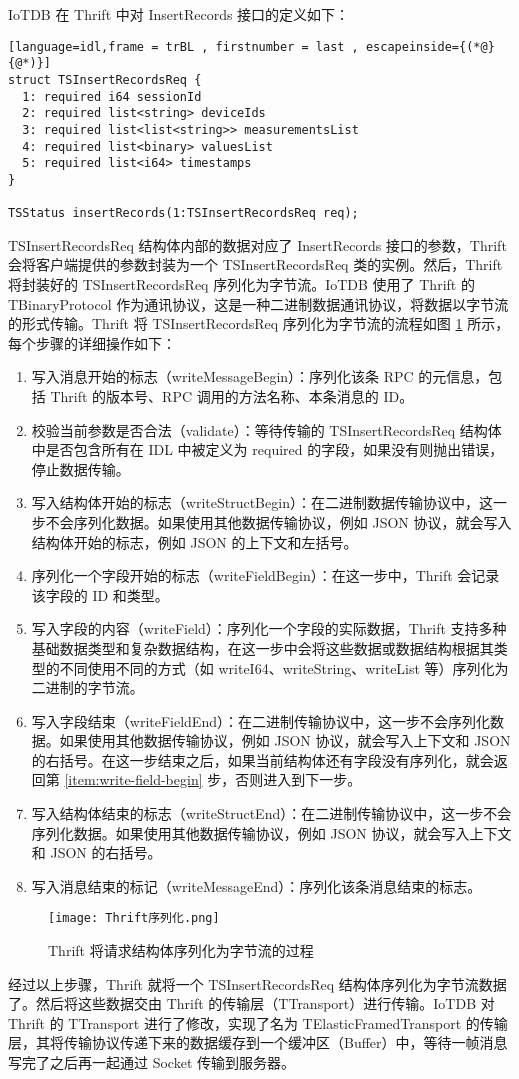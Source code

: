 IoTDB 在 Thrift 中对 InsertRecords 接口的定义如下：
\begin{lstlisting}[language=idl,frame = trBL , firstnumber = last , escapeinside={(*@}{@*)}]
struct TSInsertRecordsReq {
  1: required i64 sessionId
  2: required list<string> deviceIds
  3: required list<list<string>> measurementsList
  4: required list<binary> valuesList
  5: required list<i64> timestamps
}

TSStatus insertRecords(1:TSInsertRecordsReq req);
\end{lstlisting}
TSInsertRecordsReq 结构体内部的数据对应了 InsertRecords 接口的参数，Thrift 会将客户端提供的参数封装为一个 TSInsertRecordsReq 类的实例。然后，Thrift 将封装好的 TSInsertRecordsReq 序列化为字节流。IoTDB 使用了 Thrift 的 TBinaryProtocol 作为通讯协议，这是一种二进制数据通讯协议，将数据以字节流的形式传输。Thrift 将 TSInsertRecordsReq 序列化为字节流的流程如图 \ref{fig:thrift-serialize} 所示，每个步骤的详细操作如下：
\begin{enumerate}
  \item 写入消息开始的标志（writeMessageBegin）：序列化该条 RPC 的元信息，包括 Thrift 的版本号、RPC 调用的方法名称、本条消息的 ID。
  \item 校验当前参数是否合法（validate）：等待传输的 TSInsertRecordsReq 结构体中是否包含所有在 IDL 中被定义为 required 的字段，如果没有则抛出错误，停止数据传输。
  \item 写入结构体开始的标志（writeStructBegin）：在二进制数据传输协议中，这一步不会序列化数据。如果使用其他数据传输协议，例如 JSON 协议，就会写入结构体开始的标志，例如 JSON 的上下文和左括号。
  \item\label{item:write-field-begin}  序列化一个字段开始的标志（writeFieldBegin）：在这一步中，Thrift 会记录该字段的 ID 和类型。
  \item 写入字段的内容（writeField）：序列化一个字段的实际数据，Thrift 支持多种基础数据类型和复杂数据结构，在这一步中会将这些数据或数据结构根据其类型的不同使用不同的方式（如 writeI64、writeString、writeList 等）序列化为二进制的字节流。
  \item 写入字段结束（writeFieldEnd）：在二进制传输协议中，这一步不会序列化数据。如果使用其他数据传输协议，例如 JSON 协议，就会写入上下文和 JSON 的右括号。在这一步结束之后，如果当前结构体还有字段没有序列化，就会返回第 \ref{item:write-field-begin} 步，否则进入到下一步。
  \item 写入结构体结束的标志（writeStructEnd）：在二进制传输协议中，这一步不会序列化数据。如果使用其他数据传输协议，例如 JSON 协议，就会写入上下文和 JSON 的右括号。
  \item 写入消息结束的标记（writeMessageEnd）：序列化该条消息结束的标志。
\end{enumerate}
\begin{figure}
  \centering
  \texttt{[image: Thrift序列化.png]}
  \caption{Thrift 将请求结构体序列化为字节流的过程}
  \label{fig:thrift-serialize}
\end{figure}
经过以上步骤，Thrift 就将一个 TSInsertRecordsReq 结构体序列化为字节流数据了。然后将这些数据交由 Thrift 的传输层（TTransport）进行传输。IoTDB 对 Thrift 的 TTransport 进行了修改，实现了名为 TElasticFramedTransport 的传输层，其将传输协议传递下来的数据缓存到一个缓冲区（Buffer）中，等待一帧消息写完了之后再一起通过 Socket 传输到服务器。
